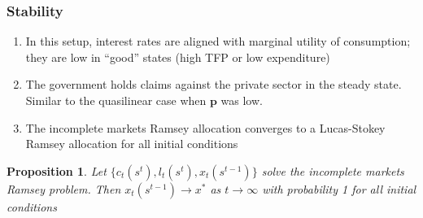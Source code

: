 \documentclass{beamer}
\newcommand{\EE}{\mathbb E}
\newtheorem{proposition}{Proposition}
\begin{document}
%
%
%
\begin{frame}
	\frametitle{Stability}
	\begin{enumerate}
	 \item In this setup, interest rates are aligned with marginal utility of consumption;  they are low  in ``good'' states (high TFP or low expenditure)
	 \item The government holds claims against the private sector in the steady state. Similar to the quasilinear case when $\bm{p}$ was low.	
	 \item The incomplete markets Ramsey allocation converges to a Lucas-Stokey  Ramsey allocation for all initial conditions	 	
	\end{enumerate}


	\begin{proposition}  Let $\{c_t(s^t), l_t(s^t), x_t(s^{t-1})\}$ solve the incomplete markets Ramsey problem.  Then  $x_t(s^{t-1})\rightarrow x^*$ as $t\rightarrow \infty$ with probability 1 for all initial conditions
	
	\end{proposition}
	\end{frame}
	
\end{document}
